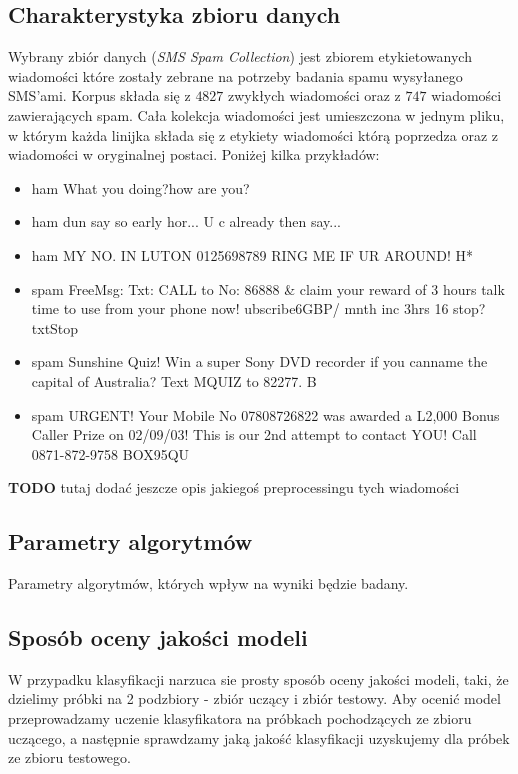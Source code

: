 \documentclass[a4paper,12pt]{article}
\begin{document}
\subsection{Charakterystyka zbioru danych}

Wybrany zbiór danych (\textit{SMS Spam Collection}) jest zbiorem etykietowanych wiadomości które zostały zebrane na potrzeby badania spamu wysyłanego SMS'ami. Korpus składa się z $4827$ zwykłych wiadomości oraz z $747$ wiadomości zawierających spam. Cała kolekcja wiadomości jest umieszczona w jednym pliku, w którym każda linijka składa się z etykiety wiadomości którą poprzedza oraz z wiadomości w oryginalnej postaci. Poniżej kilka przykładów:

\begin{itemize}
\item ham What you doing?how are you? 
\item ham dun say so early hor... U c already then say... 
\item ham MY NO. IN LUTON 0125698789 RING ME IF UR AROUND! H* 
\item spam FreeMsg: Txt: CALL to No: 86888 \& claim your reward of 3 hours talk time to use from your phone now! ubscribe6GBP/ mnth inc 3hrs 16 stop?txtStop 
\item spam Sunshine Quiz! Win a super Sony DVD recorder if you canname the capital of Australia? Text MQUIZ to 82277. B 
\item spam URGENT! Your Mobile No 07808726822 was awarded a L2,000 Bonus Caller Prize on 02/09/03! This is our 2nd attempt to contact YOU! Call 0871-872-9758 BOX95QU 
\end{itemize}

\textbf{TODO} tutaj dodać jeszcze opis jakiegoś preprocessingu tych wiadomości

\subsection{Parametry algorytmów}

Parametry algorytmów, których wpływ na wyniki będzie badany.

\subsection{Sposób oceny jakości modeli}

W przypadku klasyfikacji narzuca sie prosty sposób oceny jakości modeli, taki, że dzielimy próbki na 2 podzbiory - zbiór uczący i zbiór testowy. Aby ocenić model przeprowadzamy uczenie klasyfikatora na próbkach pochodzących ze zbioru uczącego, a następnie sprawdzamy jaką jakość klasyfikacji uzyskujemy dla próbek ze zbioru testowego.\\
\end{document}
